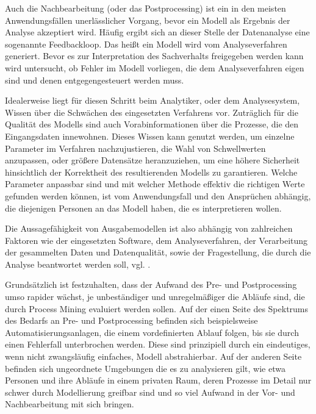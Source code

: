 Auch die Nachbearbeitung (oder das Postprocessing) ist ein in den meisten Anwendungsfällen unerlässlicher Vorgang, bevor ein  Modell als Ergebnis der Analyse akzeptiert wird. Häufig ergibt sich an dieser Stelle der Datenanalyse eine sogenannte Feedbackloop. Das heißt ein Modell wird vom Analyseverfahren generiert. Bevor es zur Interpretation des Sachverhalts freigegeben werden kann wird untersucht, ob Fehler im Modell vorliegen, die dem Analyseverfahren eigen sind und denen entgegengesteuert werden muss. 

Idealerweise liegt für diesen Schritt beim Analytiker, oder dem Analysesystem, Wissen über die Schwächen des eingesetzten Verfahrens vor. Zuträglich für die Qualität des Modells sind auch Vorabinformationen über die Prozesse, die den Eingangsdaten innewohnen. Dieses Wissen kann genutzt werden, um einzelne Parameter im Verfahren nachzujustieren, die Wahl von Schwellwerten anzupassen, oder größere Datensätze heranzuziehen, um eine höhere Sicherheit hinsichtlich der Korrektheit des resultierenden Modells zu garantieren. Welche Parameter anpassbar sind und mit welcher Methode effektiv die richtigen Werte gefunden werden können, ist vom Anwendungsfall und den Ansprüchen abhängig, die diejenigen Personen an das Modell haben, die es interpretieren wollen. 

Die Aussagefähigkeit von Ausgabemodellen ist also abhängig von zahlreichen Faktoren wie der eingesetzten Software, dem Analyseverfahren, der Verarbeitung der gesammelten Daten und Datenqualität, sowie der Fragestellung, die durch die Analyse beantwortet werden soll, vgl. \cite{PMinAction}.

Grundsätzlich ist festzuhalten, dass der Aufwand des Pre- und Postprocessing umso rapider wächst, je unbeständiger und unregelmäßiger die Abläufe sind, die durch Process Mining evaluiert werden sollen. Auf der einen Seite des Spektrums des Bedarfs an Pre- und Postprocessing befinden sich  beispielsweise Automatisierungsanlagen, die einem vordefinierten Ablauf folgen, bis sie durch einen Fehlerfall unterbrochen werden. Diese sind prinzipiell durch ein eindeutiges, wenn nicht zwangsläufig einfaches, Modell abstrahierbar. Auf der anderen Seite befinden sich ungeordnete Umgebungen die es zu analysieren gilt, wie etwa Personen und ihre Abläufe in einem privaten Raum, deren Prozesse im Detail nur schwer durch Modellierung greifbar sind und so viel Aufwand in der Vor- und Nachbearbeitung mit sich bringen. 